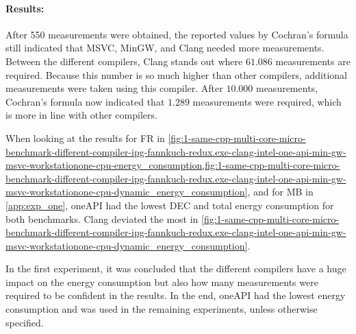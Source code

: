 \paragraph{Results:} After 550 measurements were obtained, the reported values by Cochran's formula still indicated that MSVC, MinGW, and Clang needed more measurements. Between the different compilers, Clang stands out where $61.086$ measurements are required. Because this number is so much higher than other compilers, additional measurements were taken using this compiler. After $10.000$ measurements, Cochran's formula now indicated that $1.289$ measurements were required, which is more in line with other compilers.



When looking at the results for FR in \cref{fig:1-same-cpp-multi-core-micro-benchmark-different-compiler-ipg-fannkuch-redux.exe-clang-intel-one-api-min-gw-msvc-workstationone-cpu-energy_consumption,fig:1-same-cpp-multi-core-micro-benchmark-different-compiler-ipg-fannkuch-redux.exe-clang-intel-one-api-min-gw-msvc-workstationone-cpu-dynamic_energy_consumption}, and for MB in \cref{app:exp_one}, oneAPI had the lowest DEC and total energy consumption for both benchmarks. Clang deviated the most in \cref{fig:1-same-cpp-multi-core-micro-benchmark-different-compiler-ipg-fannkuch-redux.exe-clang-intel-one-api-min-gw-msvc-workstationone-cpu-dynamic_energy_consumption}.

In the first experiment, it was concluded that the different compilers have a huge impact on the energy consumption but also how many measurements were required to be confident in the results. In the end, oneAPI had the lowest energy consumption and was used in the remaining experiments, unless otherwise specified.


